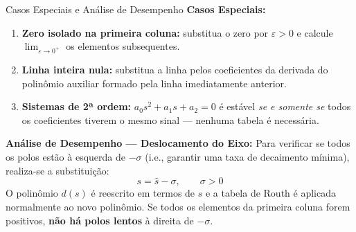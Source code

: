 \begin{frame}{Casos Especiais e Análise de Desempenho}
  \scriptsize
  \textbf{Casos Especiais:}
  \begin{enumerate}
    \item \textbf{Zero isolado na primeira coluna:} substitua o zero por $\varepsilon > 0$ e calcule $\lim_{\varepsilon \to 0^+}$ os elementos subsequentes.
    \item \textbf{Linha inteira nula:} substitua a linha pelos coeficientes da derivada do polinômio auxiliar formado pela linha imediatamente anterior.
    \item \textbf{Sistemas de 2ª ordem:} $a_0 s^2 + a_1 s + a_2 = 0$ é estável \textit{se e somente se} todos os coeficientes tiverem o mesmo sinal — nenhuma tabela é necessária.
  \end{enumerate}
  \vspace{0.4em}
  \textbf{Análise de Desempenho — Deslocamento do Eixo:}
  Para verificar se todos os polos estão à esquerda de $-\sigma$ (i.e., garantir uma taxa de decaimento mínima), realiza-se a substituição:
  \begin{equation*}
    s = \hat{s} - \sigma, \qquad \sigma > 0
  \end{equation*}
  O polinômio $d(s)$ é reescrito em termos de $\hat{s}$ e a tabela de Routh é aplicada normalmente ao novo polinômio. Se todos os elementos da primeira coluna forem positivos, \textbf{não há polos lentos} à direita de $-\sigma$.
\end{frame}


